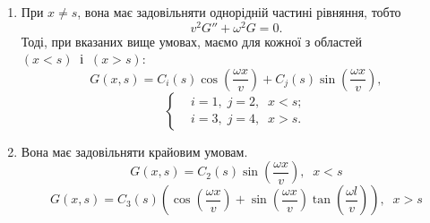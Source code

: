 \begin{enumerate} 
  \item При $x \neq s$, вона має задовільняти однорідній частині рівняння, тобто 
  \begin{equation*}
    v^2G''+\omega^2G=0.    
  \end{equation*}
  Тоді, при вказаних вище умовах, маємо для кожної з областей $(x<s) \;\;\text{і} \;\;(x>s)$:
  \begin{equation*}
    G(x,s)=C_i(s)\cos\left(\frac{\omega x}{v}\right)+C_j(s)\sin\left(\frac{\omega x}{v}\right),    
  \end{equation*}
  \begin{equation*} 
    \left\{ \begin{aligned} %
            & i=1,\; j=2,\;\; x<s;\\
            & i=3,\; j=4,\;\; x>s.
    \end{aligned} \right.
\end{equation*}

  \item Вона має задовільняти крайовим умовам.
  \begin{equation*}
    G(x,s)=C_2(s)\sin\left(\frac{\omega x}{v}\right),\;\;x<s 
  \end{equation*}
  \begin{equation*}
    G(x,s)=C_3(s)\left(\cos\left(\frac{\omega x}{v}\right)+\sin\left(\frac{\omega x}{v}\right)\tan\left(\frac{\omega l}{v}\right)\right),\;\;x>s 
  \end{equation*}
  

\end{enumerate}
